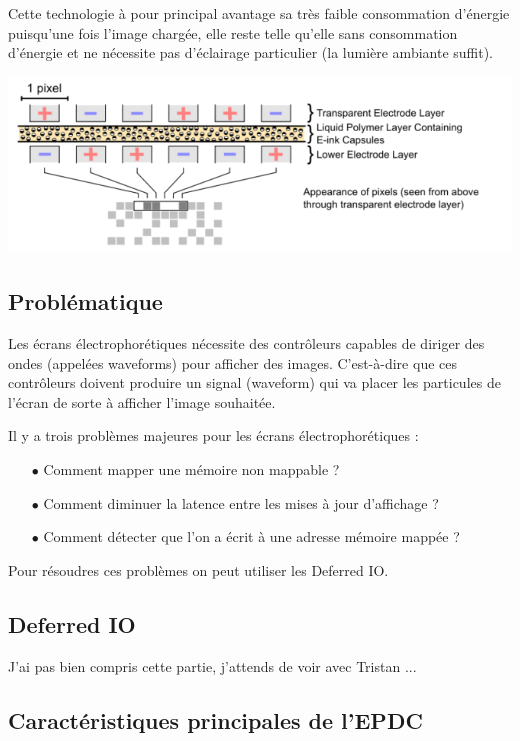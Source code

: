 Cette technologie à pour principal avantage sa très faible consommation d'énergie puisqu'une fois l'image chargée, elle reste telle qu'elle sans consommation d'énergie et ne nécessite pas d'éclairage particulier (la lumière ambiante suffit).

\begin{center}
	\includegraphics{Electrophoretic.png}
\end{center}


\subsection{Problématique}

Les écrans électrophorétiques nécessite des contrôleurs capables de diriger des ondes (appelées waveforms) pour afficher des images. C'est-à-dire que ces contrôleurs doivent produire un signal (waveform) qui va placer les particules de l'écran de sorte à afficher l'image souhaitée.

Il y a trois problèmes majeures pour les écrans électrophorétiques :
\begin{itemize}
	\item[$\bullet$] Comment mapper une mémoire non mappable ?
	\item[$\bullet$] Comment diminuer la latence entre les mises à jour d'affichage ?
	\item[$\bullet$] Comment détecter que l'on a écrit à une adresse mémoire mappée ?
\end{itemize}

Pour résoudres ces problèmes on peut utiliser les Deferred IO.

\subsection{Deferred IO}

J'ai pas bien compris cette partie, j'attends de voir avec Tristan ...

\subsection{Caractéristiques principales de l'EPDC}

